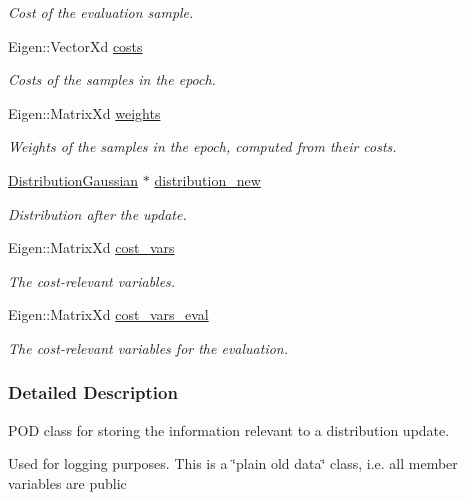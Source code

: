 \begin{DoxyCompactItemize}
\begin{DoxyCompactList}\small\item\em Cost of the evaluation sample. \end{DoxyCompactList}\item 
Eigen\+::\+Vector\+Xd \hyperlink{classDmpBbo_1_1UpdateSummary_ac3b47ca8e32f8b5cdaa23bdd375ccfd3}{costs}
\begin{DoxyCompactList}\small\item\em Costs of the samples in the epoch. \end{DoxyCompactList}\item 
Eigen\+::\+Matrix\+Xd \hyperlink{classDmpBbo_1_1UpdateSummary_a16d226260adc0af72c89783c656d25d5}{weights}
\begin{DoxyCompactList}\small\item\em Weights of the samples in the epoch, computed from their costs. \end{DoxyCompactList}\item 
\hyperlink{classDmpBbo_1_1DistributionGaussian}{Distribution\+Gaussian} $\ast$ \hyperlink{classDmpBbo_1_1UpdateSummary_a85f1c35f510f89864f15029ea16e168c}{distribution\+\_\+new}
\begin{DoxyCompactList}\small\item\em Distribution after the update. \end{DoxyCompactList}\item 
Eigen\+::\+Matrix\+Xd \hyperlink{classDmpBbo_1_1UpdateSummary_ab6057150915c96b1d20ed485a1f5ce18}{cost\+\_\+vars}
\begin{DoxyCompactList}\small\item\em The cost-\/relevant variables. \end{DoxyCompactList}\item 
Eigen\+::\+Matrix\+Xd \hyperlink{classDmpBbo_1_1UpdateSummary_a309e381520075afa088c97bf1e7e6cd0}{cost\+\_\+vars\+\_\+eval}
\begin{DoxyCompactList}\small\item\em The cost-\/relevant variables for the evaluation. \end{DoxyCompactList}\end{DoxyCompactItemize}


\subsubsection{Detailed Description}
P\+O\+D class for storing the information relevant to a distribution update. 

Used for logging purposes. This is a \char`\"{}plain old data\char`\"{} class, i.\+e. all member variables are public 

